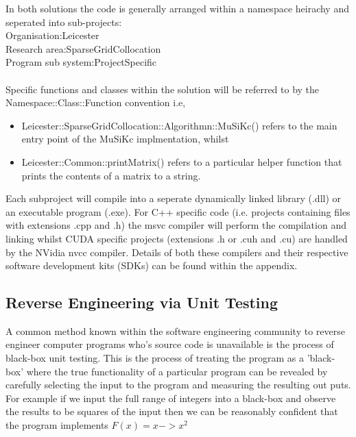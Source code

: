 \documentclass[a4paper]{amsart}
\begin{document}
In both solutions the code is generally arranged within a namespace heirachy and seperated into sub-projects:\\
		Organisation:\quad \quad \quad \quad \quad \quad Leicester\\
		Research area:\quad \quad \quad \quad \quad \quad \quad \quad SparseGridCollocation\\
		Program sub system:\quad \quad \quad\quad \quad \quad \quad \quad\quad \quad ProjectSpecific\\
\\Specific functions and classes within the solution will be referred to by the Namespace::Class::Function convention i.e,\\
\begin{itemize}
\item Leicester::SparseGridCollocation::Algorithmn::MuSiKc() refers to the main entry point of the MuSiKc implmentation, whilst 
\item Leicester::Common::printMatrix() refers to a particular helper function that prints the contents of a matrix to a string.
\end{itemize}

Each subproject will compile into a seperate dynamically linked library (.dll) or an executable program (.exe). For C++ specific code (i.e. projects containing files with extensions .cpp and .h) the msvc compiler will perform the compilation and linking whilst CUDA specific projects (extensions .h or .cuh and .cu) are handled by the NVidia nvcc compiler. Details of both these compilers and their respective software development kits (SDKs) can be found within the appendix.\\

\subsection{Reverse Engineering via Unit Testing}
A common method known within the software engineering community to reverse engineer computer programs who's source code is unavailable is the process of black-box unit testing\cite{comp1}. This is the process of treating the program as a 'black-box' where the true functionality of a particular program can be revealed by carefully selecting the input to the program and measuring the resulting out puts.\\ 

For example if we input the full range of integers into a black-box and observe the results to be squares of the input then we can be reasonably confident that the program implements $F(x) = x -> x^{2}$\\
\end{document}
